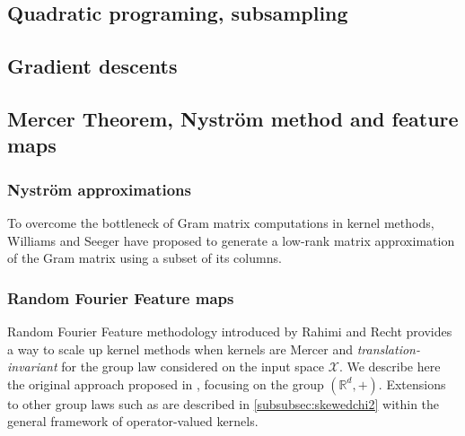 \subsection{Quadratic programing, subsampling}

\subsection{Gradient descents}

\subsection{Mercer Theorem, Nystr\"om method and feature maps}
\subsubsection{Nystr\"om approximations}
To overcome the bottleneck of Gram matrix computations in kernel methods,
Williams and Seeger \cite{Williams2000-nystrom} have proposed to generate a
low-rank matrix approximation of the Gram matrix using a subset of its columns.
\subsubsection{Random Fourier Feature maps}
Random Fourier Feature methodology introduced  by Rahimi and Recht
\cite{Rahimi2007} provides a way to scale up kernel methods when kernels are
Mercer and \emph{translation-invariant}  for the group law considered on the
input space $\mathcal{X}$. We describe here the original approach proposed in
\cite{Rahimi2007}, focusing on the group $(\mathbb{R}^d, +)$. Extensions to
other group laws such as \cite{li2010random} are described in
\cref{subsubsec:skewedchi2} within the general framework of operator-valued
kernels.
